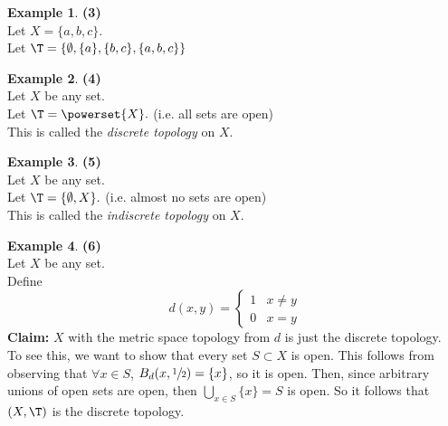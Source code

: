 \documentclass[a5paper]{article}
\theoremstyle{definition}%
\newtheorem*{example*}{Example}
\numberwithin{exercise}{section}
\theoremstyle{remark}%
\begin{document}
\begin{example*}\textbf{(3)}\\
Let $X = \{a,b,c\}$.\\
Let $\T = \{\emptyset, \{a\}, \{b,c\}, \{a,b,c\}\}$
\end{example*}

\begin{example*}\textbf{(4)}\\
Let $X$ be any set.\\
Let $\T=\powerset{X}.$ (i.e. all sets are open)\\
This is called the \emph{discrete topology} on $X$. 
\end{example*}

\begin{example*}\textbf{(5)}\\
Let $X$ be any set.\\
Let $\T=\{\emptyset, X\}.$ (i.e. almost no sets are open)\\
This is called the \emph{indiscrete topology} on $X$. 
\end{example*}

\begin{example*}\textbf{(6)}\\
Let $X$ be any set.\\
Define $$d(x,y)=
\begin{cases}
1 &  x \neq y\\
0 &  x = y
\end{cases}$$
\textbf{Claim:} $X$ with the metric space topology from $d$ is just the discrete topology. \\
To see this, we want to show that every set $S \subset X$ is open. This follows from observing that $\forall x \in S$, $B_d(x,\sfrac{1}{2})=\{x\}$, so it is open. Then, since arbitrary unions of open sets are open, then $\bigcup_{x\in S}\{x\} = S$ is open. So it follows that $(X,\T)$ is the discrete topology. 
\end{example*}
\end{document}
